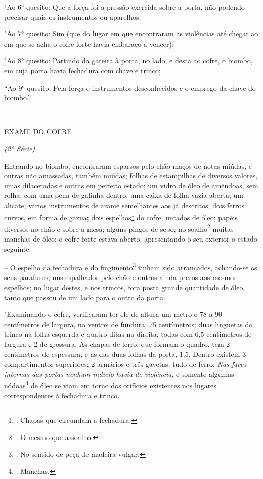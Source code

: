 "Ao 6° quesito: Que a força foi a pressão exercida sobre a porta, não
podendo precisar quais os instrumentos ou aparelhos;

"Ao 7° quesito: Sim (que do lugar em que encontraram as violências até
chegar ao em que se acha o cofre-forte havia embaraço a vencer);

"Ao 8° quesito: Partindo da gateira à porta, no lado, e desta ao cofre,
o biombo, em cuja porta havia fechadura com chave e trinco;

``Ao 9° quesito: Pela força e instrumentos desconhecidos e o emprego da
chave do biombo.''

\_\_\_\_\_\_\_\_\_\_\_\_\_\_\_\_\_\_\_\_

EXAME DO COFRE

\emph{(2ª Série)}

Entrando no biombo, encontraram esparsos pelo chão maços de notas
miúdas, e outras não amassadas, também miúdas; folhas de estampilhas de
diversos valores, umas dilaceradas e outras em perfeito estado; um vidro
de óleo de amêndoas, sem rolha, com uma pena de galinha dentro; uma
caixa de folha vazia aberta; um alicate; vários instrumentos de arame
semelhantes aos já descritos; dois ferros curvos, em forma de gazua;
dois espelhos\footnote{. Chapas que circundam a fechadura.} do cofre,
untados de óleo; papéis diversos no chão e sobre a mesa; alguns pingos
de sebo; no soalho\footnote{. O mesmo que assoalho.} muitas manchas de
óleo; o cofre-forte estava aberto, apresentando o seu exterior o estado
seguinte:

-- O espelho da fechadura e do fingimento\footnote{. No sentido de peça
  de madeira vulgar.} tinham sido arrancados, achando-se os seus
parafusos, uns espalhados pelo chão e outros ainda presos aos mesmos
espelhos; no lugar destes, e nos trincos, fora posta grande quantidade
de óleo, tanto que passou de um lado para o outro da porta.

"Examinando o cofre, verificaram ter ele de altura um metro e 78 a 90
centímetros de largura, no ventre; de fundura, 75 centímetros; duas
linguetas do trinco na folha esquerda e quatro ditas na direita, todas
com 6,5 centímetros de largura e 2 de grossura. As chapas de ferro, que
formam o quadro, tem 2 centímetros de espessura; e as das duas folhas da
porta, 1,5. Dentro existem 3 compartimentos superiores; 2 armários e
três gavetas, tudo de ferro; \emph{Nas faces internas das portas nenhum
indício havia de violência}, e somente algumas nódoas\footnote{.
  Manchas.} de óleo se viam em torno dos orifícios existentes nos
lugares correspondentes à fechadura e trinco.

